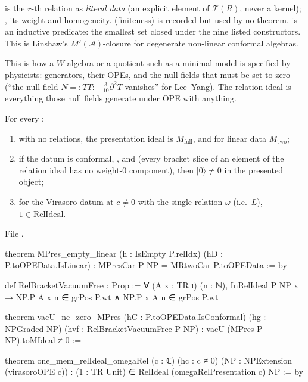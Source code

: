 \begin{dictionary}
 is the $r$-th relation as \emph{literal data} (an explicit element of $\mathcal T(R)$, never a kernel); ,
 its weight and homogeneity.  (finiteness) is recorded but used by no theorem.  is an
inductive predicate: the smallest set closed under the nine listed constructors. This is Linshaw's $M'(\mathcal A)$-closure for
degenerate non-linear conformal algebras.
\end{dictionary}

\begin{physics}
This is how a $W$-algebra or a quotient such as a minimal model is specified by physicists: generators, their OPEs, and the null
fields that must be set to zero (``the null field $N = {:}TT{:}-\frac3{10}\partial^2T$ vanishes'' for Lee--Yang). The relation ideal is
everything those null fields generate under OPE with anything.
\end{physics}

\begin{theorem}\label{l11:thm:vapres}
For every :
\begin{enumerate}
\item with no relations, the presentation ideal is $M_{\mathrm{full}}$, and for linear data $M_{\mathrm{two}}$;
\item if the datum is conformal, , and  (every bracket slice of an element of the relation
  ideal has no weight-$0$ component), then $|0\rangle\neq0$ in the presented object;
\item for the Virasoro datum at $c\neq0$ with the single relation $\omega$ (i.e.\ $L$), $1\in\mathrm{RelIdeal}$.
\end{enumerate}
\end{theorem}
\noindent File .
\begin{leancode}
theorem MPres_empty_linear (h : IsEmpty P.relIdx) (hD : P.toOPEData.IsLinear) :
    MPresCar P NP = MRtwoCar P.toOPEData := by

def RelBracketVacuumFree : Prop :=
  ∀ (A x : TR ι) (n : ℕ), InRelIdeal P NP x →
    NP.P A x n ∈ grPos P.wt ∧ NP.P x A n ∈ grPos P.wt

theorem vacU_ne_zero_MPres (hC : P.toOPEData.IsConformal) (hg : NPGraded NP)
    (hvf : RelBracketVacuumFree P NP) : vacU (MPres P NP).toMIdeal ≠ 0 :=

theorem one_mem_relIdeal_omegaRel (c : ℂ) (hc : c ≠ 0)
    (NP : NPExtension (virasoroOPE c)) :
    (1 : TR Unit) ∈ RelIdeal (omegaRelPresentation c) NP := by
\end{leancode}

